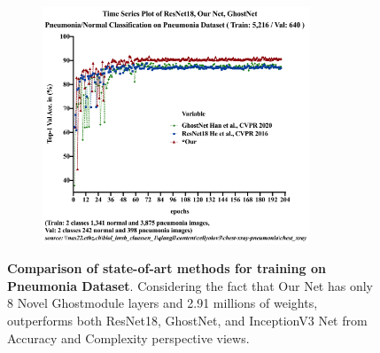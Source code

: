 \begin{figure}[b]
\centering
\includegraphics[height=200pt,width=0.9\textwidth]{thesis-template-master/images/Pneumonia_TimeSeries-1.png}
\label{fig}
\centering
\caption{ \textbf{Comparison of state-of-art methods for training on Pneumonia Dataset}.  Considering the fact that Our Net has only 8 Novel Ghostmodule layers and 2.91 millions of weights, outperforms both ResNet18, GhostNet, and InceptionV3 Net from Accuracy and Complexity perspective views.}
\end{figure}


